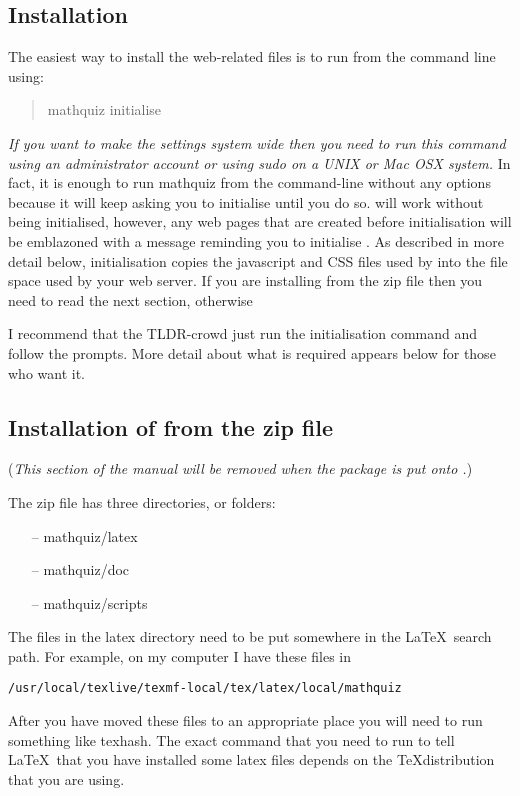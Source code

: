\documentclass[svgnames]{article}
\newif\ifCtan\Ctanfalse %
\newcommand\ddash{\texttt{\textemdash\textemdash}}
\newcommand\mathquizopt[1]{\textsf{mathquiz \ddash#1}}
\begin{document}
    \subsection{Installation}

    The easiest way to install the web-related files is to run \MathQuiz
    from the command line using:
    \begin{quote}
      \mathquizopt{initialise}
    \end{quote}
    \textit{If you want to make the settings system wide then you need
    to run this command using an administrator account or using
    \textsf{sudo} on a UNIX or Mac OSX system.}
    In fact, it is enough to run \textsf{mathquiz} from the command-line
    without any options because it will keep asking you to initialise
    until you do so. \MathQuiz will work without being initialised,
    however, any web pages that are created before initialisation will
    be emblazoned with a message reminding you to initialise \MathQuiz.
    As described in more detail below, initialisation copies the
    javascript and CSS files used by \MathQuiz into the file space used
    by your web server.
    \ifCtan\else If you are installing \MathQuiz from the zip file then
    you need to read the next section, otherwise
    \fi

    I recommend that the TLDR-crowd just run the initialisation command
    and follow the prompts. More detail about what is required appears
    below for those who want it.

    \ifCtan\else

    \subsection{Installation of \MathQuiz from the zip file}

    (\textit{This section of the manual will be removed when the
    package is put onto .})

      The \MathQuiz zip file has three directories, or folders:

      \begin{itemize}
        \item[--] mathquiz/latex
        \item[--] mathquiz/doc
        \item[--] mathquiz/scripts
      \end{itemize}

      The files in the \textsf{latex} directory need to be put somewhere in the \LaTeX\
    search path. For example, on my computer I have these files in
    \begin{center}
       \Verb|/usr/local/texlive/texmf-local/tex/latex/local/mathquiz|
    \end{center}
    After you have moved these files to an appropriate place you will need to run
    something like texhash. The exact command that you need to run to
    tell \LaTeX\ that you have installed some latex files depends on the
    \TeX distribution that you are using.
\end{document}
